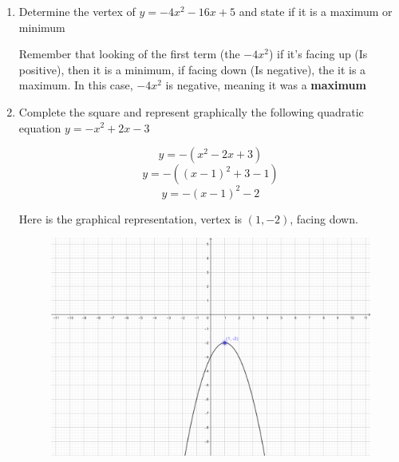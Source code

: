 \documentclass[paper=a4, fontsize=11pt]{scrartcl}
\begin{document}
\begin{enumerate}[resume]
    \item Determine the vertex of $y=-4x^2-16x+5$ and state if it is a maximum or minimum
    
    Remember that looking of the first term (the $-4x^2$) if it's facing up (Is positive), then it is a minimum, if facing down (Is negative), the it is a maximum. In this case, $-4x^2$ is negative, meaning it was a \textbf{maximum}
    \item Complete the square and represent graphically the following quadratic equation $y=-x^2+2x-3$
    
    $$y=-(x^2-2x+3)$$
    $$y=-((x-1)^2+3-1)$$
    $$y=-(x-1)^2-2$$

    Here is the graphical representation, vertex is $(1,-2)$, facing down.

    \begin{figure}[h!]
        \centering
        \includegraphics[scale=0.5]{MathExamReview/10-parabola.png}
    \end{figure}


\end{enumerate}
\end{document}
